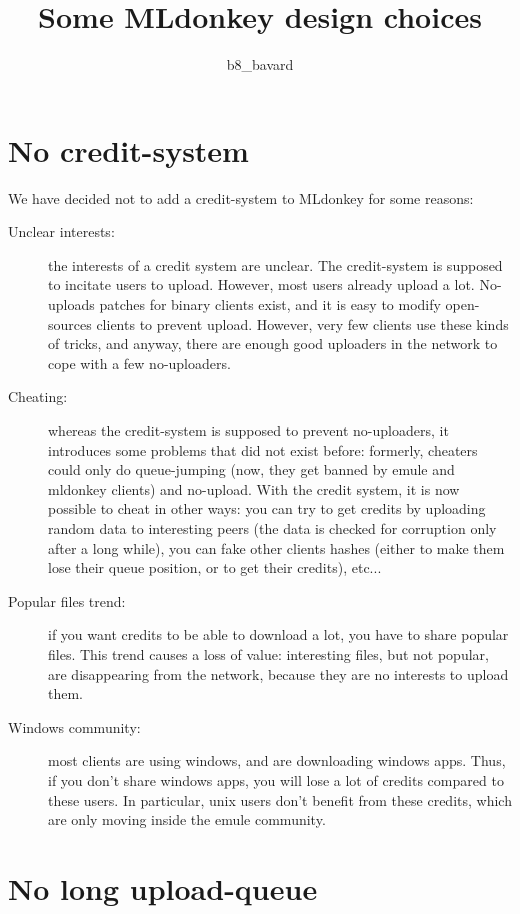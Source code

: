 \documentclass{article}
\author{b8\_bavard}
\title{Some MLdonkey design choices}
\begin{document}
\section{No credit-system}

We have decided not to add a credit-system to MLdonkey for some reasons:

 \begin{description}

 \item[Unclear interests:] the interests of a credit system are unclear. The
credit-system is supposed to incitate users to upload. However, most users
already upload a lot. No-uploads patches for binary clients exist, and it is
easy to modify open-sources clients to prevent upload. However, very few
clients use these kinds of tricks, and anyway, there are enough good
uploaders in the network to cope with a few no-uploaders.

 \item[Cheating:] whereas the credit-system is supposed to prevent
no-uploaders, it introduces some problems that did not exist before:
formerly, cheaters could only do queue-jumping (now, they get banned by emule
and mldonkey clients) and no-upload. With the credit system, it is now
possible to cheat in other ways: you can try to get credits by uploading
random data to interesting peers (the data is checked for corruption only
after a long while), you can fake other clients hashes (either to make them
lose their queue position, or to get their credits), etc...

 \item[Popular files trend:] if you want credits to be able to download a
lot, you have to share popular files. This trend causes a loss of value:
interesting files, but not popular, are disappearing from the network,
because they are no interests to upload them.

 \item[Windows community:] most clients are using windows, and are downloading
windows apps. Thus, if you don't share windows apps, you will lose a lot of 
credits compared to these users. In particular, unix users don't benefit from 
these credits, which are only moving inside the emule community.

\end{description}

\section{No long upload-queue}
\end{document}
